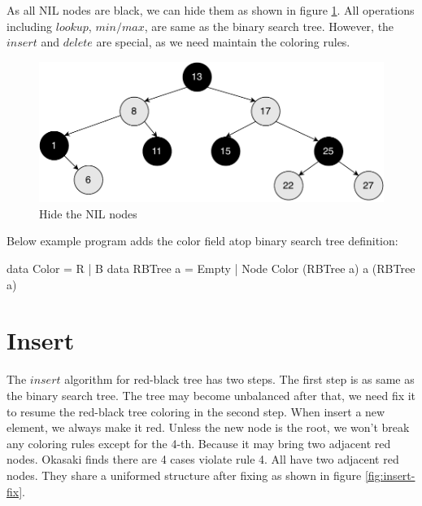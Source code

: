 \documentclass[b5paper]{article}
\begin{document}
As all NIL nodes are black, we can hide them as shown in figure \ref{fig:rbt-example}. All operations including $lookup$, $min/max$, are same as the binary search tree. However, the $insert$ and $delete$ are special, as we need maintain the coloring rules.

\begin{figure}[htbp]
  \centering
  \includegraphics[scale=0.4]{img/rbt-example}
  \caption{Hide the NIL nodes}
  \label{fig:rbt-example}
\end{figure}

Below example program adds the color field atop binary search tree definition:

\begin{Haskell}
data Color = R | B
data RBTree a = Empty
              | Node Color (RBTree a) a (RBTree a)
\end{Haskell}

\begin{Exercise}
\end{Exercise}

\section{Insert}

The $insert$ algorithm for red-black tree has two steps. The first step is as same as the binary search tree. The tree may become unbalanced after that, we need fix it to resume the red-black tree coloring in the second step. When insert a new element, we always make it red. Unless the new node is the root, we won't break any coloring rules except for the 4-th. Because it may bring two adjacent red nodes. Okasaki finds there are 4 cases violate rule 4. All have two adjacent red nodes. They share a uniformed structure after fixing\cite{okasaki} as shown in figure \ref{fig:insert-fix}.
\end{document}
